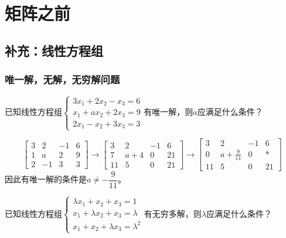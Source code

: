 \chapter{矩阵之前}

    \section{补充：线性方程组}

        \subsection{唯一解，无解，无穷解问题}

            \begin{example}
                已知线性方程组$\begin{cases}3x_1+2x_2-x_3=6\\x_1+ax_2+2x_3=9\\2x_1-x_2+3x_3=3\end{cases}$有唯一解，则$a$应满足什么条件？
            \end{example}

            \begin{solution}
                \[
                    \begin{bmatrix}3&2&-1&6\\1&a&2&9\\2&-1&3&3\end{bmatrix}\rightarrow\begin{bmatrix}3&2&-1&6\\7&a+4&0&21\\11&5&0&21\end{bmatrix}\rightarrow\begin{bmatrix}3&2&-1&6\\0&a+\frac{9}{11}&0&*\\11&5&0&21\end{bmatrix}
                \]
                因此有唯一解的条件是$a\neq-\dfrac{9}{11}$。
            \end{solution}

            \begin{example}
                已知线性方程组$\begin{cases}\lambda x_1+x_2+x_3=1\\x_1+\lambda x_2+x_3=\lambda\\x_1+x_2+\lambda x_3=\lambda^2\end{cases}$有无穷多解，则$\lambda$应满足什么条件？
            \end{example}

